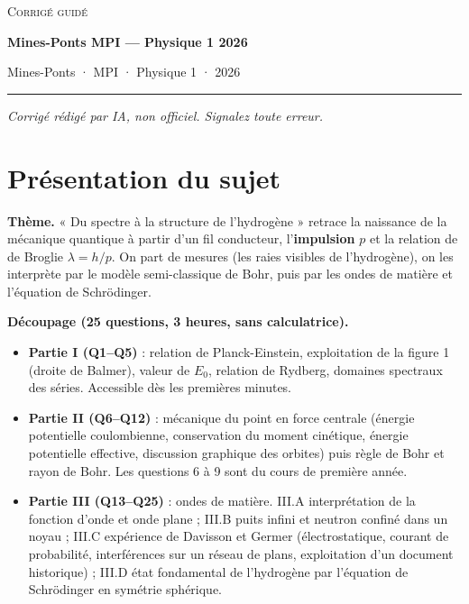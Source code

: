 \documentclass[11pt,a4paper]{article}
\providecommand{\tightlist}{\setlength{\itemsep}{0pt}\setlength{\parskip}{0pt}}
\begin{document}
\thispagestyle{plain}
\begin{center}
  {\small\scshape Corrigé guidé}\par\smallskip
  {\LARGE\bfseries Mines-Ponts MPI — Physique 1 2026\par}\medskip
  {\large Mines-Ponts · MPI · Physique 1 · 2026\par}
\end{center}
\vspace{2pt}\hrule\vspace{8pt}

\emph{Corrigé rédigé par IA, non officiel. Signalez toute erreur.}

\hypertarget{pruxe9sentation-du-sujet}{%
\section{Présentation du sujet}\label{pruxe9sentation-du-sujet}}

\textbf{Thème.} « Du spectre à la structure de l'hydrogène » retrace la naissance de la mécanique quantique à partir d'un fil conducteur, l'\textbf{impulsion} \(p\) et la relation de de Broglie \(\lambda=h/p\). On part de mesures (les raies visibles de l'hydrogène), on les interprète par le modèle semi-classique de Bohr, puis par les ondes de matière et l'équation de Schrödinger.

\textbf{Découpage (25 questions, 3 heures, sans calculatrice).}

\begin{itemize}
\tightlist
\item
  \textbf{Partie I (Q1--Q5)} : relation de Planck-Einstein, exploitation de la figure 1 (droite de Balmer), valeur de \(E_0\), relation de Rydberg, domaines spectraux des séries. Accessible dès les premières minutes.
\item
  \textbf{Partie II (Q6--Q12)} : mécanique du point en force centrale (énergie potentielle coulombienne, conservation du moment cinétique, énergie potentielle effective, discussion graphique des orbites) puis règle de Bohr et rayon de Bohr. Les questions 6 à 9 sont du cours de première année.
\item
  \textbf{Partie III (Q13--Q25)} : ondes de matière. III.A interprétation de la fonction d'onde et onde plane ; III.B puits infini et neutron confiné dans un noyau ; III.C expérience de Davisson et Germer (électrostatique, courant de probabilité, interférences sur un réseau de plans, exploitation d'un document historique) ; III.D état fondamental de l'hydrogène par l'équation de Schrödinger en symétrie sphérique.
\end{itemize}
\end{document}
